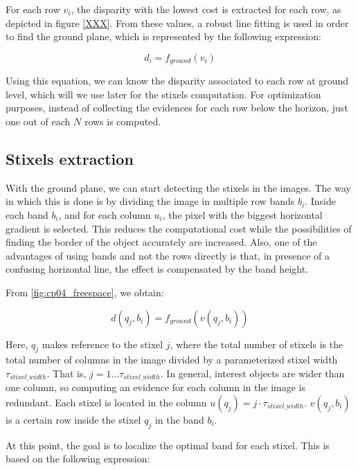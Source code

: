 For each row $v_i$, the disparity with the lowest cost is extracted for each row, as depicted in figure \ref{XXX}. From these values, a robust line fitting is used in order to find the ground plane, which is represented by the following expression:

\begin{equation}\label{eq:cp04_ground_plane_function}
  d_i = f_{ground}(v_i)
\end{equation}

Using this equation, we can know the disparity associated to each row at ground level, which will we use later for the stixels computation. For optimization purposes, instead of collecting the evidences for each row below the horizon, just one out of each $N$ rows is computed. 

\subsection{Stixels extraction}\label{ch:chapter04_01_02}

With the ground plane, we can start detecting the stixels in the images. The way in which this is done is by dividing the image in multiple row bands $b_i$. Inside each band $b_i$, and for each column $u_i$, the pixel with the biggest horizontal gradient is selected. This reduces the computational cost while the possibilities of finding the border of the object accurately are increased. Also, one of the advantages of using bands and not the rows directly is that, in presence of a confusing horizontal line, the effect is compensated by the band height.

From \ref{fig:cp04_freespace}, we obtain:

\begin{equation}\label{eq:cp04_ground_plane_function_by_band}
  d(q_j, b_i) = f_{ground}(v(q_j, b_i))
\end{equation}

Here, $q_j$ makes reference to the stixel $j$, where the total number of stixels is the total number of columns in the image divided by a parameterized stixel width $\tau_{stixel\_width}$. That is, $j=1 \dots \tau_{stixel\_width}$. In general, interest objects are wider than one column, so computing an evidence for each column in the image is redundant. Each stixel is located in the column $u(q_j) = j \cdot \tau_{stixel\_width}$. $v(q_j, b_i)$ is a certain row inside the stixel $q_j$ in the band $b_i$. 

At this point, the goal is to localize the optimal band for each stixel. This is based on the following expression:

